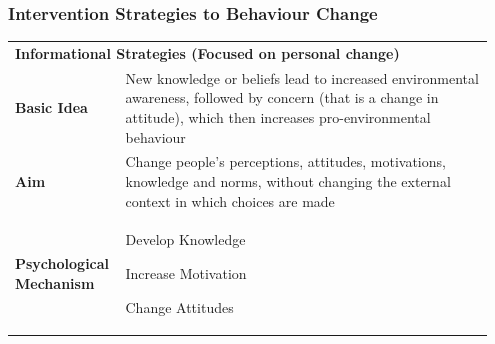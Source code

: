 \documentclass[11pt]{article}
\theoremstyle{definition}
\begin{document}
\subsubsection{Intervention Strategies to Behaviour Change}
\begin{tabularx}{\linewidth}{p{0.2\linewidth} p{0.75\linewidth}}
	\multicolumn{2}{l}{\cellcolor{SteelBlue1!75} \textbf{Informational Strategies (Focused on personal change)}}\\
	\textbf{Basic Idea} & New knowledge or beliefs lead to increased environmental awareness, followed by concern (that is a change in attitude), which then increases pro-environmental behaviour \\
	\textbf{Aim} & Change people's perceptions, attitudes, motivations, knowledge and norms, without changing the external context in which choices are made\\
	\textbf{Psychological Mechanism} & \begin{itemize}[
		left=0pt,
		nosep,
		before={\begin{minipage}[t]{\hsize}},
			after={\end{minipage}}
		]
		\item Develop Knowledge
		\item Increase Motivation
		\item Change Attitudes
	\end{itemize}
\end{tabularx}
\end{document}
